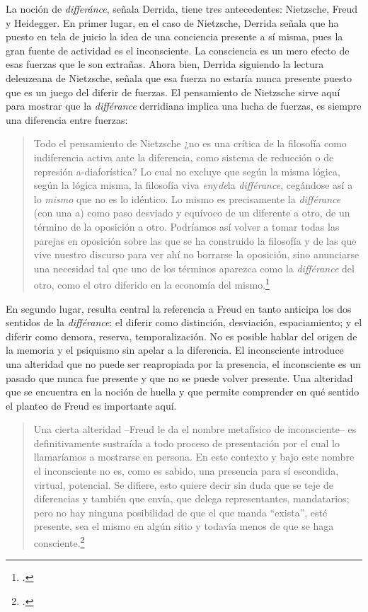 \documentclass{book}
\begin{document}
La noción de \emph{differánce}, señala Derrida, tiene tres antecedentes:
Nietzsche, Freud y Heidegger. En primer lugar, en el caso de Nietzsche,
Derrida señala que ha puesto en tela de juicio la idea de una conciencia
presente a sí misma, pues la gran fuente de actividad es el
inconsciente. La consciencia es un mero efecto de esas fuerzas que le
son extrañas. Ahora bien, Derrida siguiendo la lectura deleuzeana de
Nietzsche, señala que esa fuerza no estaría nunca presente puesto que es
un juego del diferir de fuerzas. El pensamiento de Nietzsche sirve aquí
para mostrar que la \emph{différance} derridiana implica una lucha de
fuerzas, es siempre una diferencia entre fuerzas:

\begin{quote}
Todo el pensamiento de Nietzsche ¿no es una crítica de la filosofía como
indiferencia activa ante la diferencia, como sistema de reducción o de
represión a-diaforística? Lo cual no excluye que según la misma lógica,
según la lógica misma, la filosofía viva \emph{en}y\emph{de}la
\emph{différance}, cegándose así a lo \emph{mismo} que no es lo
idéntico. Lo mismo es precisamente la \emph{différance} (con una a) como
paso desviado y equívoco de un diferente a otro, de un término de la
oposición a otro. Podríamos así volver a tomar todas las parejas en
oposición sobre las que se ha construido la filosofía y de las que vive
nuestro discurso para ver ahí no borrarse la oposición, sino anunciarse
una necesidad tal que uno de los términos aparezca como la
\emph{différance} del otro, como el otro diferido en la economía del
mismo.\footcite[18]{derrida1989a}
\end{quote}

En segundo lugar, resulta central la referencia a Freud en tanto
anticipa los dos sentidos de la \emph{différance}: el diferir como
distinción, desviación, espaciamiento; y el diferir como demora,
reserva, temporalización. No es posible hablar del origen de la memoria
y el psiquismo sin apelar a la diferencia. El inconsciente introduce una
alteridad que no puede ser reapropiada por la presencia, el inconsciente
es un pasado que nunca fue presente y que no se puede volver presente.
Una alteridad que se encuentra en la noción de huella y que permite
comprender en qué sentido el planteo de Freud es importante aquí.

\begin{quote}
Una cierta alteridad --Freud le da el nombre metafísico de
inconsciente-- es definitivamente sustraída a todo proceso de
presentación por el cual lo llamaríamos a mostrarse en persona. En este
contexto y bajo este nombre el inconsciente no es, como es sabido, una
presencia para sí escondida, virtual, potencial. Se difiere, esto quiere
decir sin duda que se teje de diferencias y también que envía, que
delega representantes, mandatarios; pero no hay ninguna posibilidad de
que el que manda ``exista'', esté presente, sea el mismo en algún sitio
y todavía menos de que se haga consciente.\footcite[21]{derrida1989a}
\end{quote}
\end{document}
